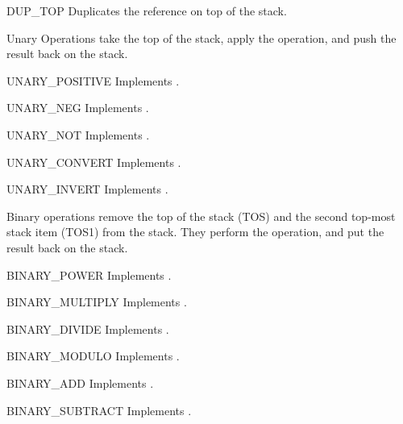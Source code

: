 \begin{funcdesc}{DUP_TOP}{}
Duplicates the reference on top of the stack.
\end{funcdesc}

Unary Operations take the top of the stack, apply the operation, and
push the result back on the stack.

\begin{funcdesc}{UNARY_POSITIVE}{}
Implements .
\end{funcdesc}

\begin{funcdesc}{UNARY_NEG}{}
Implements .
\end{funcdesc}

\begin{funcdesc}{UNARY_NOT}{}
Implements .
\end{funcdesc}

\begin{funcdesc}{UNARY_CONVERT}{}
Implements .
\end{funcdesc}

\begin{funcdesc}{UNARY_INVERT}{}
Implements .
\end{funcdesc}

Binary operations remove the top of the stack (TOS) and the second top-most
stack item (TOS1) from the stack.  They perform the operation, and put the
result back on the stack.

\begin{funcdesc}{BINARY_POWER}{}
Implements .
\end{funcdesc}

\begin{funcdesc}{BINARY_MULTIPLY}{}
Implements .
\end{funcdesc}

\begin{funcdesc}{BINARY_DIVIDE}{}
Implements .
\end{funcdesc}

\begin{funcdesc}{BINARY_MODULO}{}
Implements .
\end{funcdesc}

\begin{funcdesc}{BINARY_ADD}{}
Implements .
\end{funcdesc}

\begin{funcdesc}{BINARY_SUBTRACT}{}
Implements .
\end{funcdesc}

